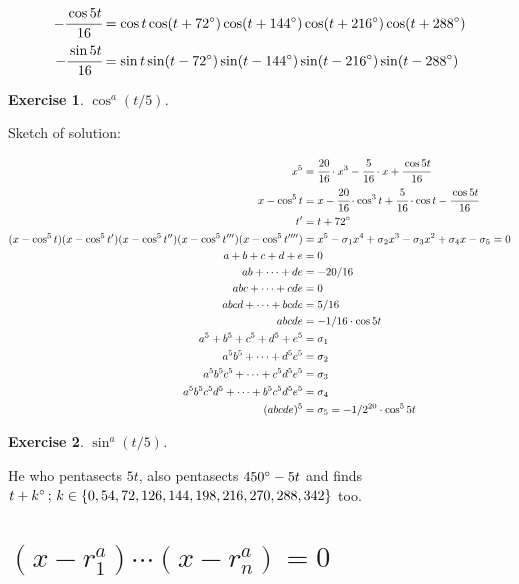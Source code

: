 \documentclass[11pt,a4paper]{article}
\newtheorem{exercise}{Exercise}
\begin{document}
\begin{align}
- \cfrac{\cos 5t}{16} &= \cos t \cos (t + 72\degree) \cos (t + 144\degree) \cos (t + 216\degree) \cos (t + 288\degree) \\
- \cfrac{\sin 5t}{16} &= \sin t \sin (t - 72\degree) \sin (t - 144\degree) \sin (t - 216\degree) \sin (t - 288\degree)
\end{align}

\vspace{3mm}

\begin{exercise}
$\cos^a (t/5)$.
\end{exercise}

Sketch of solution:

\begin{align}
x^5 &= \cfrac{20}{16} \cdot x^3 - \cfrac{5}{16} \cdot x + \cfrac{\cos 5t}{16} \\
x - \cos^5 t &= x - \cfrac{20}{16} \cdot \cos^3 t + \cfrac{5}{16} \cdot \cos t - \cfrac{\cos 5t}{16} \\
t' &= t + 72\degree \\
(x - \cos^5 t)(x - \cos^5 t')(x - \cos^5 t'')(x - \cos^5 t''')(x - \cos^5 t'''') &= x^5 - \sigma_1 x^4 + \sigma_2 x^3 - \sigma_3 x^2 + \sigma_4 x - \sigma_5 = 0 \\
a + b + c + d + e &= 0 \\
ab + \cdots + de &= -20/16 \\
abc + \cdots + cde &= 0 \\
abcd + \cdots + bcde &= 5/16 \\
abcde &= -1/16 \cdot \cos 5t \\
a^5 + b^5 + c^5 + d^5 + e^5 &= \sigma_1 \\
a^5b^5 + \cdots + d^5e^5 &= \sigma_2 \\
a^5b^5c^5 + \cdots + c^5d^5e^5 &= \sigma_3 \\
a^5b^5c^5d^5 + \cdots + b^5c^5d^5e^5 &= \sigma_4 \\
(abcde)^5 &= \sigma_5 = -1/2^{20} \cdot \cos^5 5t \\
\end{align}

\begin{exercise}
$\sin^a (t/5)$.
\end{exercise}

He who pentasects $5t$, also pentasects $450\degree - 5t$ and finds $t + k \degree\,;\, k \in \{ 0, 54, 72, 126, 144, 198, 216, 270, 288, 342 \}$ too.

\section{$(x - r_1^a)\cdots(x - r_n^a) = 0$}
\end{document}
